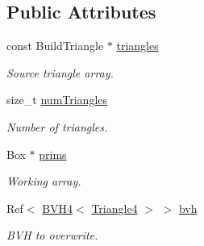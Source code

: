 \subsection*{Public Attributes}
\begin{DoxyCompactItemize}
\item 
\hypertarget{classembree_1_1_b_v_h4_builder_af89f5d1b610f84ab13f6868b2b41e8c6}{
const BuildTriangle $\ast$ \hyperlink{classembree_1_1_b_v_h4_builder_af89f5d1b610f84ab13f6868b2b41e8c6}{triangles}}
\label{classembree_1_1_b_v_h4_builder_af89f5d1b610f84ab13f6868b2b41e8c6}

\begin{DoxyCompactList}\small\item\em Source triangle array. \item\end{DoxyCompactList}\item 
\hypertarget{classembree_1_1_b_v_h4_builder_a69ad7ed26f43d932fd56a32368cf2482}{
size\_\-t \hyperlink{classembree_1_1_b_v_h4_builder_a69ad7ed26f43d932fd56a32368cf2482}{numTriangles}}
\label{classembree_1_1_b_v_h4_builder_a69ad7ed26f43d932fd56a32368cf2482}

\begin{DoxyCompactList}\small\item\em Number of triangles. \item\end{DoxyCompactList}\item 
Box $\ast$ \hyperlink{classembree_1_1_b_v_h4_builder_a95aacdf4cc45706d06642ab484ceb0ea}{prims}
\begin{DoxyCompactList}\small\item\em Working array. \item\end{DoxyCompactList}\item 
\hypertarget{classembree_1_1_b_v_h4_builder_aaf60392ce85c6554b4b58c5e001240f1}{
Ref$<$ \hyperlink{classembree_1_1_b_v_h4}{BVH4}$<$ \hyperlink{structembree_1_1_triangle4}{Triangle4} $>$ $>$ \hyperlink{classembree_1_1_b_v_h4_builder_aaf60392ce85c6554b4b58c5e001240f1}{bvh}}
\label{classembree_1_1_b_v_h4_builder_aaf60392ce85c6554b4b58c5e001240f1}

\begin{DoxyCompactList}\small\item\em BVH to overwrite. \item\end{DoxyCompactList}\end{DoxyCompactItemize}


